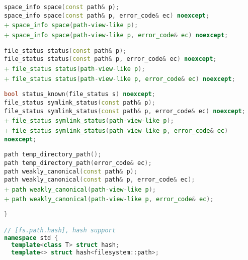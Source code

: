 \documentclass[11pt]{article}
\newcommand{\code}[2][cpp]{\lstinline[language=#1,basicstyle=\small\ttfamily]{#2}}
\newcommand{\tsreplace}[3]{\textcolor{red}{\sout{#1}}#2\textcolor{darkgreen}{#3}}
\begin{document}
\tsreplace{}{  \code{space_info space(const path& p);}}{}\\
\tsreplace{}{  \code{space_info space(const path& p, error_code& ec) noexcept;}}{}\\
\tsreplace{}{}{+ \code{space_info space(path-view-like p);}}\\
\tsreplace{}{}{+ \code{space_info space(path-view-like p, error_code& ec) noexcept;}}

\tsreplace{}{  \code{file_status status(const path& p);}}{}\\
\tsreplace{}{  \code{file_status status(const path& p, error_code& ec) noexcept;}}{}\\
\tsreplace{}{}{+ \code{file_status status(path-view-like p);}}\\
\tsreplace{}{}{+ \code{file_status status(path-view-like p, error_code& ec) noexcept;}}

\tsreplace{}{  \code{bool status_known(file_status s) noexcept;}}{}\\

\tsreplace{}{  \code{file_status symlink_status(const path& p);}}{}\\
\tsreplace{}{  \code{file_status symlink_status(const path& p, error_code& ec) noexcept;}}{}\\
\tsreplace{}{}{+ \code{file_status symlink_status(path-view-like p);}}\\
\tsreplace{}{}{+ \code{file_status symlink_status(path-view-like p, error_code& ec) noexcept;}}

\tsreplace{}{  \code{path temp_directory_path();}}{}\\
\tsreplace{}{  \code{path temp_directory_path(error_code& ec);}}{}\\

\tsreplace{}{  \code{path weakly_canonical(const path& p);}}{}\\
\tsreplace{}{  \code{path weakly_canonical(const path& p, error_code& ec);}}{}\\
\tsreplace{}{}{+ \code{path weakly_canonical(path-view-like p);}}\\
\tsreplace{}{}{+ \code{path weakly_canonical(path-view-like p, error_code& ec);}}

\begin{lstlisting}[language=cpp]
}

// [fs.path.hash], hash support
namespace std {
  template<class T> struct hash;
  template<> struct hash<filesystem::path>;
\end{lstlisting}
\end{document}
